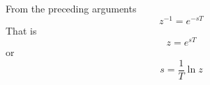 From the preceding arguments
  \begin{equation}
    \label{eq:l11e1}
    z^{-1} = e^{-sT}
  \end{equation}
  That is
  \begin{equation}
    \label{eq:l11e2}
    z=e^{sT}
  \end{equation}
or
\begin{equation}
  \label{eq:l11e3}
  s=\frac{1}{T}\ln z
\end{equation}
\endinput
